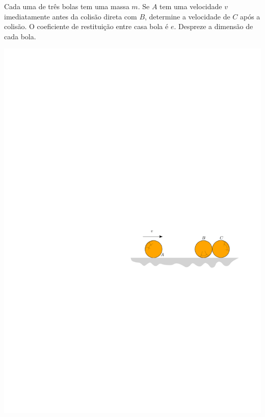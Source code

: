 \item Cada uma de três bolas tem uma massa $m$. Se $A$ tem uma velocidade $v$ imediatamente antes da colisão direta com $B$, determine a velocidade de $C$ após a colisão. O coeficiente de restituição entre casa bola é $e$. Despreze
a dimensão de cada bola.

\begin{flushright}
	\includegraphics[scale=1.2]{images/draw_5}
\end{flushright}